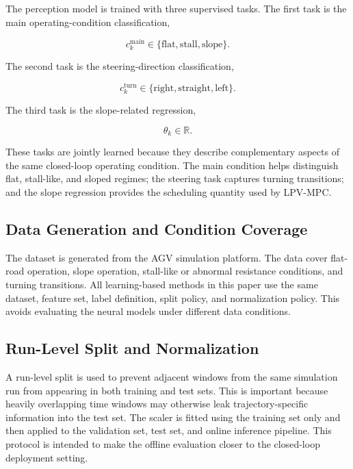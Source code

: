 \documentclass{ieeeaccess}
\begin{document}
The perception model is trained with three supervised tasks. The first task is the main operating-condition classification,

\begin{equation}
c^{\mathrm{main}}_k \in \{\mathrm{flat}, \mathrm{stall}, \mathrm{slope}\}.
\label{eq:main_task}
\end{equation}

The second task is the steering-direction classification,

\begin{equation}
c^{\mathrm{turn}}_k \in \{\mathrm{right}, \mathrm{straight}, \mathrm{left}\}.
\label{eq:turn_task}
\end{equation}

The third task is the slope-related regression,

\begin{equation}
\theta_k \in \mathbb{R}.
\label{eq:theta_task}
\end{equation}

These tasks are jointly learned because they describe complementary aspects of the same closed-loop operating condition. The main condition helps distinguish flat, stall-like, and sloped regimes; the steering task captures turning transitions; and the slope regression provides the scheduling quantity used by LPV-MPC.

\subsection{Data Generation and Condition Coverage}

The dataset is generated from the AGV simulation platform. The data cover flat-road operation, slope operation, stall-like or abnormal resistance conditions, and turning transitions. All learning-based methods in this paper use the same dataset, feature set, label definition, split policy, and normalization policy. This avoids evaluating the neural models under different data conditions.

\subsection{Run-Level Split and Normalization}

A run-level split is used to prevent adjacent windows from the same simulation run from appearing in both training and test sets. This is important because heavily overlapping time windows may otherwise leak trajectory-specific information into the test set. The scaler is fitted using the training set only and then applied to the validation set, test set, and online inference pipeline. This protocol is intended to make the offline evaluation closer to the closed-loop deployment setting.
\end{document}
